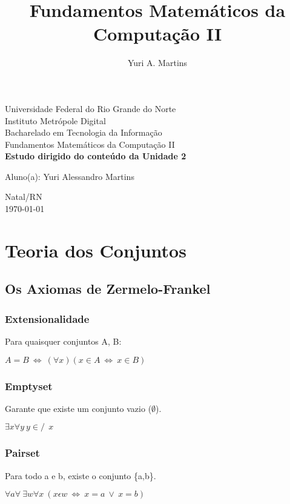 \documentclass[12pt, a4paper]{article}
\author{Yuri A. Martins}
\title{Fundamentos Matemáticos da Computação II}
\begin{document}
	\begin{titlepage}
		\begin{center}
			{\large Universidade Federal do Rio Grande do Norte}\\[0.2cm]
			{\large Instituto Metr\'opole Digital}\\[0.2cm]
			{\large Bacharelado em Tecnologia da Informa\c{c}\~ao}\\[0.2cm]
			{\large Fundamentos Matem\'aticos da Computa\c{c}\~ao II}\\[5.1cm]
			{\bf \huge Estudo dirigido do conte\'udo da Unidade 2}\\[5.1cm]
		\end{center}
		{\large Aluno(a): Yuri Alessandro Martins}\\[0.7cm]
		\begin{center}
			{\large Natal/RN}\\[0.2cm]
			{\large \today}
		\end{center}
	\end{titlepage} 

	\tableofcontents
	\clearpage

	\section{Teoria dos Conjuntos}
		\subsection{Os Axiomas de Zermelo-Frankel}
			
			\subsubsection{Extensionalidade}
			\label{sec:extensionalidade}
				Para quaisquer conjuntos A, B:\\
				\begin{center}
				$A = B ~ \Leftrightarrow ~ (\forall x ) (x \in A ~ \Leftrightarrow ~ x \in B) $
				\end{center}
			\subsubsection{Emptyset}
			\label{sec:emptyset}
				Garante que existe um conjunto vazio ($\emptyset$). \\
				\begin{center}
				$ \exists x \forall y ~ y \in\!\!\!\!\!/ ~~ x $
				\end{center}
			\subsubsection{Pairset}
				Para todo a e b, existe o conjunto \{a,b\}.\\
				\begin{center}
				$ \forall a \forall ~ \exists w \forall x ~ (x \epsilon w ~ \Leftrightarrow ~ x = a ~\vee~ x = b ) $
				\end{center}
\end{document}

